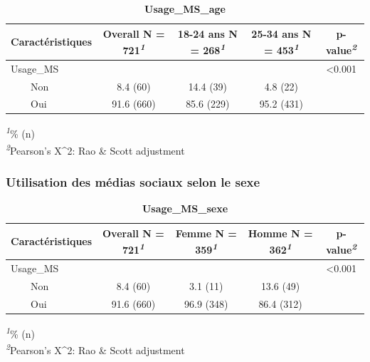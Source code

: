 \documentclass[
]{article}
\begin{document}
\newpage
\begin{table}[!t]
\caption{\label{tab:unnamed-chunk-41}\textbf{Usage\_MS\_age}} 
\fontsize{12.0pt}{14.4pt}\selectfont
\begin{tabular*}{\linewidth}{@{\extracolsep{\fill}}lcccc}
\toprule
\textbf{Caractéristiques} & \textbf{Overall}  N = 721\textsuperscript{\textit{1}} & \textbf{18-24 ans}  N = 268\textsuperscript{\textit{1}} & \textbf{25-34 ans}  N = 453\textsuperscript{\textit{1}} & \textbf{p-value}\textsuperscript{\textit{2}} \\ 
\midrule\addlinespace[2.5pt]
Usage\_MS &  &  &  & <0.001 \\ 
    Non & 8.4 (60) & 14.4 (39) & 4.8 (22) &  \\ 
    Oui & 91.6 (660) & 85.6 (229) & 95.2 (431) &  \\ 
\bottomrule
\end{tabular*}
\begin{minipage}{\linewidth}
\textsuperscript{\textit{1}}\% (n)\\
\textsuperscript{\textit{2}}Pearson's X\^{}2: Rao \& Scott adjustment\\
\end{minipage}
\end{table}

\vspace{1cm}

\hypertarget{utilisation-des-muxe9dias-sociaux-selon-le-sexe-1}{%
\subsubsection{Utilisation des médias sociaux selon le
sexe}\label{utilisation-des-muxe9dias-sociaux-selon-le-sexe-1}}

\newpage
\begin{table}[!t]
\caption{\label{tab:unnamed-chunk-42}\textbf{Usage\_MS\_sexe}} 
\fontsize{12.0pt}{14.4pt}\selectfont
\begin{tabular*}{\linewidth}{@{\extracolsep{\fill}}lcccc}
\toprule
\textbf{Caractéristiques} & \textbf{Overall}  N = 721\textsuperscript{\textit{1}} & \textbf{Femme}  N = 359\textsuperscript{\textit{1}} & \textbf{Homme}  N = 362\textsuperscript{\textit{1}} & \textbf{p-value}\textsuperscript{\textit{2}} \\ 
\midrule\addlinespace[2.5pt]
Usage\_MS &  &  &  & <0.001 \\ 
    Non & 8.4 (60) & 3.1 (11) & 13.6 (49) &  \\ 
    Oui & 91.6 (660) & 96.9 (348) & 86.4 (312) &  \\ 
\bottomrule
\end{tabular*}
\begin{minipage}{\linewidth}
\textsuperscript{\textit{1}}\% (n)\\
\textsuperscript{\textit{2}}Pearson's X\^{}2: Rao \& Scott adjustment\\
\end{minipage}
\end{table}
\end{document}
